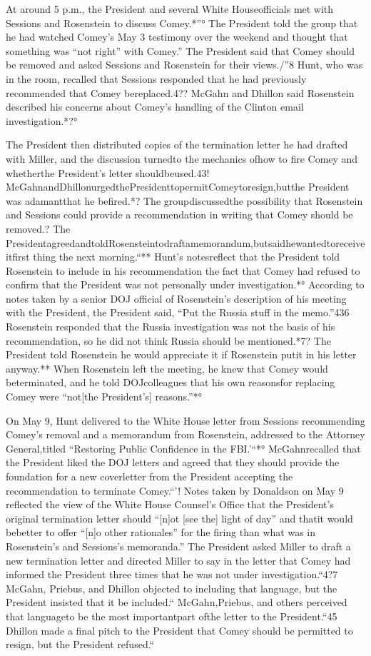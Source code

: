 {At around 5 p.m., the President and several White Houseofficials met with Sessions and Rosenstein to discuss Comey.*”°
The President told the group that he had watched Comey’s May 3 testimony over the weekend and thought that something was “not right” with Comey.”
The President said that Comey should be removed and asked Sessions and Rosenstein for their views./”8
Hunt, who was in the room, recalled that Sessions responded that he had previously recommended that Comey bereplaced.4??
McGahn and Dhillon said Rosenstein described his concerns about Comey’s handling of the Clinton email investigation.*?°

The President then distributed copies of the termination letter he had drafted with Miller, and the discussion turnedto the mechanics ofhow to fire Comey and whetherthe President’s letter shouldbeused.43!
McGahnandDhillonurgedthePresidenttopermitComeytoresign,butthe President was adamantthat he befired.*?
The groupdiscussedthe possibility that Rosenstein and Sessions could provide a recommendation in writing that Comey should be removed.?
The PresidentagreedandtoldRosensteintodraftamemorandum,butsaidhewantedtoreceiveitfirst thing the next morning.“**
Hunt’s notesreflect that the President told Rosenstein to include in his recommendation the fact that Comey had refused to confirm that the President was not personally under investigation.*°
According to notes taken by a senior DOJ official of Rosenstein’s description of his meeting with the President, the President said, “Put the Russia stuff in the memo.”436
Rosenstein responded that the Russia investigation was not the basis of his recommendation, so he did not think Russia should be mentioned.*7?
The President told Rosenstein he would appreciate it if Rosenstein putit in his letter anyway.**
When Rosenstein left the meeting, he knew that Comey would beterminated, and he told DOJcolleagues that his own reasonsfor replacing Comey were “not[the President’s] reasons.”*°

On May 9, Hunt delivered to the White House letter from Sessions recommending Comey’s removal and a memorandum from Rosenstein, addressed to the Attorney General,titled “Restoring Public Confidence in the FBI.’“*°
McGahnrecalled that the President liked the DOJ letters and agreed that they should provide the foundation for a new coverletter from the President accepting the recommendation to terminate Comey.“'!
Notes taken by Donaldson on May 9 reflected the view of the White House Counsel’s Office that the President’s original termination letter should “[n]ot [see the] light of day” and thatit would bebetter to offer “[n]o other rationales” for the firing than what was in Rosenstein’s and Sessions’s memoranda.”
The President asked Miller to draft a new termination letter and directed Miller to say in the letter that Comey had informed the President three times that he was not under investigation.“4?7
McGahn, Priebus, and Dhillon objected to including that language, but the President insisted that it be included.“
McGahn,Priebus, and others perceived that languageto be the most importantpart ofthe letter to the President.“45
Dhillon made a final pitch to the President that Comey should be permitted to resign, but the President refused.“

}
